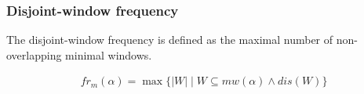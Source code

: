\documentclass[dvipsnames]{beamer}
\newcommand{\sequencetickmarks}[3]
{
    \pgfmathsetmacro\secondtickmark{#2+0.5}
    \pgfmathsetmacro\lasttickmark{#2+0.5*#1}

    \draw (#2,#3) -- (\lasttickmark,#3);

    \foreach \x in {#2,\secondtickmark,...,\lasttickmark}
        \draw (\x,#3) -- +(0,3pt);
}
\newcommand{\sequenceeventtypes}[4]
{
    \pgfmathsetlengthmacro\nodeheight{(#2)+(.8em)}

    \foreach \t/\eventtype [evaluate=\t as \x using (\t-#3)*0.5+(#1)] in {#4}
    {
        \node [font=\vphantom{$ fbd $}] at (\x,#2) {$ \eventtype $};
        \node (t\t) [inner sep=0] at (\x,\nodeheight) {};
    }
}
\newcommand{\windowthingy}[2]
{
    \pgfmathsetmacro\windowthingylength{#2*0.5-0.1}
    \draw [thick] #1 ++(0,3pt) -- ++(0,-3pt) -- ++(\windowthingylength,0) -- ++(0,3pt);
}
\begin{document}
\fi
\iffalse
\begin{frame}
\frametitle{Minimal-window frequency?}

$ fr_m(\alpha) = | mw(\alpha) | $ ?
\pause
\par\bigskip
Not monotonic!

\begin{center}
\begin{tikzpicture}
\sequencetickmarks{6}{0}{0}
\sequenceeventtypes{0}{1em}{1}{1/a,2/b,3/a,4/c,5/b,6/c}
\node at (-1,0.5em) [anchor=east] {$ a \to b \to c $};
\windowthingy{(0,-10pt)}{4}
\windowthingy{(1,-15pt)}{4}
\end{tikzpicture}
\end{center}
\begin{center}
\begin{tikzpicture}
\sequencetickmarks{6}{0}{0}
\sequenceeventtypes{0}{1em}{1}{1/a,2/b,3/a,4/c,5/b,6/c}
\node at (-1,0.5em) [anchor=east] {$ a \to c $};
\windowthingy{(1,-10pt)}{2}
\end{tikzpicture}
\end{center}

\end{frame}
\fi
\begin{frame}
\frametitle{Disjoint-window frequency}

The disjoint-window frequency is defined as the maximal number of non-overlapping minimal windows.

\begin{align*}
fr_m(\alpha) = \max\{ | W | \mid W \subseteq mw(\alpha) \wedge dis(W) \}
\end{align*}

\end{frame}
\end{document}
